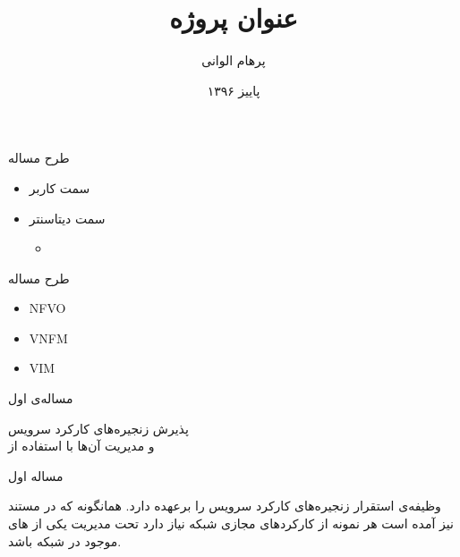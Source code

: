 \documentclass{beamer}
\title{
	عنوان پروژه
}
\subtitle{}
\author{پرهام الوانی}
\institute{دانشکده مهندسی کامپیوتر و فناوری اطلاعات}
\date{پاییز ۱۳۹۶}
\makeatletter
\newcommand{\RTList}{\raggedleft\rightskip\@totalleftmargin}
\makeatother
\begin{document}
\begin{persian}
\begin{frame}
\maketitle
\end{frame}

\everypar{\rightskip\rightmargin}
\begin{frame}{طرح مساله}
	\begin{itemize}\RTList{}
		\item سمت کاربر
		\item سمت دیتاسنتر
		\begin{itemize}\RTList{}
			\item {}
		\end{itemize}
	\end{itemize}
\end{frame}
\begin{frame}{طرح مساله}
	\begin{latin}
		\begin{itemize}
			\item NFVO
			\item VNFM
			\item VIM
		\end{itemize}
	\end{latin}
\end{frame}
\begin{frame}
	\begin{multicols}{3}
		\begin{center}	
			مساله‌ی اول
		\end{center}
	\end{multicols}
	\begin{center}	
		پذیرش زنجیره‌های کارکرد سرویس
		\\
		و مدیریت آن‌ها با استفاده از 
	\end{center}
\end{frame}
\begin{frame}{مساله اول}
	\par
	 وظیفه‌ی استقرار زنجیره‌های کارکرد سرویس را برعهده دارد.
	همانگونه که در مستند  نیز آمده است هر نمونه از کارکردهای مجازی شبکه نیاز دارد
	تحت مدیریت یکی از های موجود در شبکه باشد.
\end{frame}

\end{persian}
\end{document}
